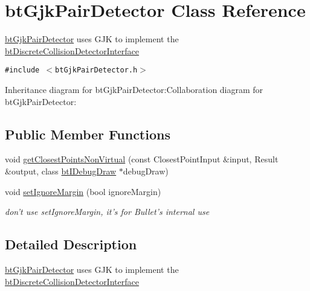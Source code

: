 \hypertarget{classbt_gjk_pair_detector}{
\section{btGjkPairDetector Class Reference}
\label{classbt_gjk_pair_detector}
}
\hyperlink{classbt_gjk_pair_detector}{btGjkPairDetector} uses GJK to implement the \hyperlink{structbt_discrete_collision_detector_interface}{btDiscreteCollisionDetectorInterface}  


{\tt \#include $<$btGjkPairDetector.h$>$}

Inheritance diagram for btGjkPairDetector:Collaboration diagram for btGjkPairDetector:\subsection*{Public Member Functions}
\begin{CompactItemize}
\item 
void \hyperlink{classbt_gjk_pair_detector_bc29953dd7aee59e9ca887963c26c8c2}{getClosestPointsNonVirtual} (const ClosestPointInput \&input, Result \&output, class \hyperlink{classbt_i_debug_draw}{btIDebugDraw} $\ast$debugDraw)
\item 
\hypertarget{classbt_gjk_pair_detector_93e9752920c57c39faca247fc005750e}{
void \hyperlink{classbt_gjk_pair_detector_93e9752920c57c39faca247fc005750e}{setIgnoreMargin} (bool ignoreMargin)}
\label{classbt_gjk_pair_detector_93e9752920c57c39faca247fc005750e}

\begin{CompactList}\small\item\em don't use setIgnoreMargin, it's for Bullet's internal use \item\end{CompactList}\end{CompactItemize}


\subsection{Detailed Description}
\hyperlink{classbt_gjk_pair_detector}{btGjkPairDetector} uses GJK to implement the \hyperlink{structbt_discrete_collision_detector_interface}{btDiscreteCollisionDetectorInterface} 

